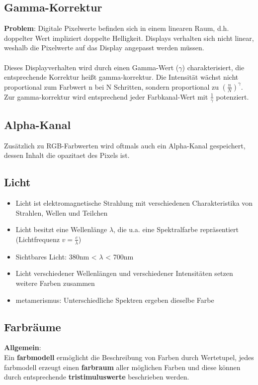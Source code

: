 \documentclass[10pt,a4paper]{article}
\begin{document}
	\subsection{Gamma-Korrektur}
	\textbf{Problem}: Digitale Pixelwerte befinden sich in einem linearen Raum, d.h. doppelter Wert impliziert doppelte Helligkeit. Displays verhalten sich nicht linear, weshalb die Pixelwerte auf das Display angepasst werden müssen.
	\\\\
	Dieses Displayverhalten wird durch einen Gamma-Wert ($\gamma$) charakterisiert, die entsprechende Korrektur heißt \Gls{gamma-korrektur}. Die Intensität wächst nicht proportional zum Farbwert n bei N Schritten, sondern proportional zu $(\frac{n}{N})^{\gamma}$. Zur \Gls{gamma-korrektur} wird entsprechend jeder Farbkanal-Wert mit $\frac{1}{\gamma}$ potenziert.

	\subsection{Alpha-Kanal}
	Zusätzlich zu RGB-Farbwerten wird oftmals auch ein Alpha-Kanal gespeichert, dessen Inhalt die \Gls{opazitaet} des Pixels ist.

	\subsection{Licht}
	\begin{itemize}
		\item Licht ist elektromagnetische Strahlung mit verschiedenen Charakteristika von Strahlen, Wellen und Teilchen
		\item Licht besitzt eine Wellenlänge $\lambda$, die u.a. eine Spektralfarbe repräsentiert (Lichtfrequenz $v = \frac{c}{\lambda}$)
		\item Sichtbares Licht: 380nm < $\lambda$ < 700nm
		\item Licht verschiedener Wellenlängen und verschiedener Intensitäten setzen weitere Farben zusammen
		\item \Gls{metamerismus}: Unterschiedliche Spektren ergeben dieselbe Farbe
	\end{itemize}

	\subsection{Farbräume}
	\textbf{Allgemein}:\\
	Ein \textbf{\Gls{farbmodell}} ermöglicht die Beschreibung von Farben durch Wertetupel, jedes \Gls{farbmodell} erzeugt einen \textbf{\Gls{farbraum}} aller möglichen Farben und diese können durch entsprechende \textbf{\Gls{tristimuluswerte}} beschrieben werden.
\end{document}
